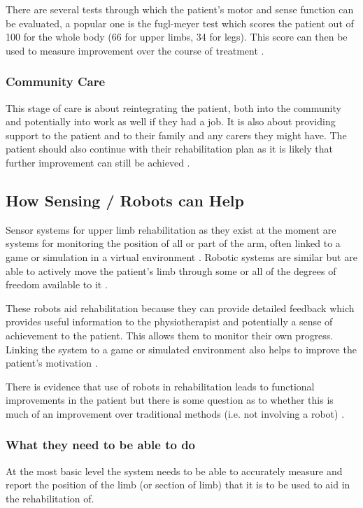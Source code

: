 \documentclass[journal]{IEEEtran}
\begin{document}
There are several tests through which the patient's motor and sense function 
can be evaluated, a popular one is the fugl-meyer test which scores the patient 
out of 100 for the whole body (66 for upper limbs, 34 for legs). This score can 
then be used to measure improvement over the course of treatment \cite{fuglmeyer}.

\subsubsection{Community Care}
This stage of care is about reintegrating the patient, both into the community and potentially 
into work as well if they had a job. It is also about providing support to the patient and 
to their family and any carers they might have. The patient should also continue with 
their rehabilitation plan as it is likely that further improvement can still be achieved \cite{Physio}.

\subsection{How Sensing / Robots can Help}
Sensor systems for upper limb rehabilitation as they exist at the moment are systems for monitoring the 
position of all or part of the arm, often linked to a game or simulation in a virtual environment \cite{AdvancesPush}.
Robotic systems are similar but are able to actively move the patient's limb through some or all 
of the degrees of freedom available to it \cite{AdvancesPush}.

These robots aid rehabilitation because they can provide detailed feedback which 
provides useful information to the physiotherapist and potentially a sense of achievement to 
the patient. This allows them to monitor their own progress. Linking the system to a game or simulated 
environment also helps to improve the patient's motivation \cite{AdvancesPush}.

There is evidence that use of robots in rehabilitation leads to functional improvements in the patient 
but there is some question as to whether this is much of an improvement over traditional methods 
(i.e. not involving a robot) \cite{AdvancesPush}.

\subsubsection{What they need to be able to do}
At the most basic level the system needs to be able to accurately measure and report the 
position of the limb (or section of limb) that it is to be used to aid in the rehabilitation of.
\end{document}
